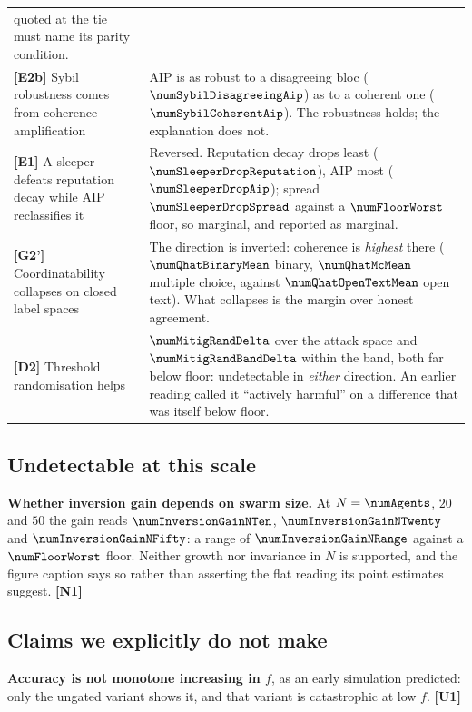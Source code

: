 \begin{table}[t]
\begin{tabular}{@{}p{}p{}@{}}
quoted at the tie must name its parity condition. \\
\addlinespace
\textbf{[E2b]} Sybil robustness comes from coherence amplification &
AIP is as robust to a disagreeing bloc ($\numSybilDisagreeingAip$) as to a
coherent one ($\numSybilCoherentAip$). The robustness holds; the explanation does
not. \\
\addlinespace
\textbf{[E1]} A sleeper defeats reputation decay while AIP reclassifies it &
Reversed. Reputation decay drops least ($\numSleeperDropReputation$), AIP most
($\numSleeperDropAip$); spread $\numSleeperDropSpread$ against a
$\numFloorWorst$ floor, so marginal, and reported as marginal. \\
\addlinespace
\textbf{[G2']} Coordinatability collapses on closed label spaces &
The direction is inverted: coherence is \emph{highest} there
($\numQhatBinaryMean$ binary, $\numQhatMcMean$ multiple choice, against
$\numQhatOpenTextMean$ open text). What collapses is the margin over honest
agreement. \\
\addlinespace
\textbf{[D2]} Threshold randomisation helps &
$\numMitigRandDelta$ over the attack space and $\numMitigRandBandDelta$ within
the band, both far below floor: undetectable in \emph{either} direction. An earlier reading called it
``actively harmful'' on a difference that was itself below floor. \\
\bottomrule
\end{tabular}
\end{table}

\subsection{Undetectable at this scale}

\textbf{Whether inversion gain depends on swarm size.} At $N=\numAgents$, $20$
and $50$ the gain reads $\numInversionGainNTen$, $\numInversionGainNTwenty$ and
$\numInversionGainNFifty$: a range of $\numInversionGainNRange$ against a
$\numFloorWorst$ floor. Neither growth nor invariance in $N$ is supported, and
the figure caption says so rather than asserting the flat reading its point
estimates suggest. \textbf{[N1]}

\subsection{Claims we explicitly do not make}

\textbf{Accuracy is not monotone increasing in $f$}, as an early simulation
predicted: only the ungated variant shows it, and that variant is catastrophic at
low $f$. \textbf{[U1]}

